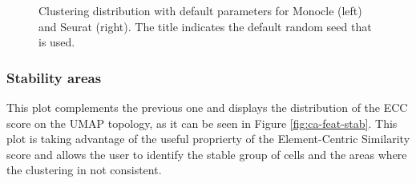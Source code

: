\begin{figure}[H]
    \centering
    \caption{\label{fig:ca-feat-cluster}Clustering distribution with default parameters for Monocle (left) and Seurat (right). The title indicates the default random seed that is used.}
\end{figure}

\subsubsection{Stability areas}
This plot complements the previous one and displays the distribution of the ECC score on the UMAP topology, as it can be seen in Figure \ref{fig:ca-feat-stab}. This plot is taking advantage of the useful proprierty of the Element-Centric Similarity score and allows the user to identify the stable group of cells and the areas where the clustering in not consistent.

